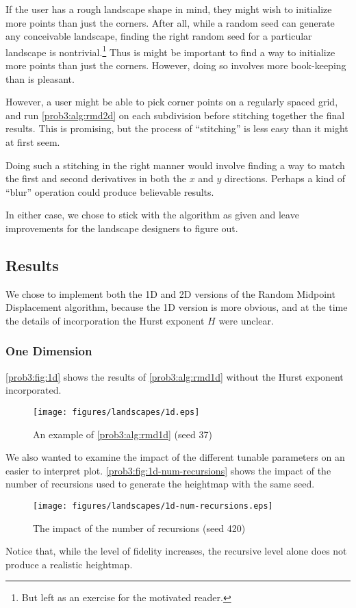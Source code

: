 If the user has a rough landscape shape in mind, they might wish to initialize more points than just the corners.
After all, while a random seed can generate any conceivable landscape, finding the right random seed for a particular landscape is nontrivial.\footnote{But left as an exercise for the motivated reader.}
Thus is might be important to find a way to initialize more points than just the corners.
However, doing so involves more book-keeping than is pleasant.

However, a user might be able to pick corner points on a regularly spaced grid, and run \autoref{prob3:alg:rmd2d} on each subdivision before stitching together the final results.
This is promising, but the process of ``stitching'' is less easy than it might at first seem.

Doing such a stitching in the right manner would involve finding a way to match the first and second derivatives in both the $x$ and $y$ directions.
Perhaps a kind of ``blur'' operation could produce believable results.

In either case, we chose to stick with the algorithm as given and leave improvements for the landscape designers to figure out.

\subsection{Results}
We chose to implement both the 1D and 2D versions of the Random Midpoint Displacement algorithm, because the 1D version is more obvious, and at the time the details of incorporation the Hurst exponent $H$ were unclear.

\subsubsection{One Dimension}
\autoref{prob3:fig:1d} shows the results of \autoref{prob3:alg:rmd1d} without the Hurst exponent incorporated.
\begin{figure}[H]
    \centering
    \texttt{[image: figures/landscapes/1d.eps]}
    \caption{An example of \autoref{prob3:alg:rmd1d} (seed 37)}\label{prob3:fig:1d}
\end{figure}

We also wanted to examine the impact of the different tunable parameters on an easier to interpret plot.
\autoref{prob3:fig:1d-num-recursions} shows the impact of the number of recursions used to generate the heightmap with the same seed.
\begin{figure}[H]
    \centering
    \texttt{[image: figures/landscapes/1d-num-recursions.eps]}
    \caption{The impact of the number of recursions (seed 420)}\label{prob3:fig:1d-num-recursions}
\end{figure}
Notice that, while the level of fidelity increases, the recursive level alone does not produce a realistic heightmap.

